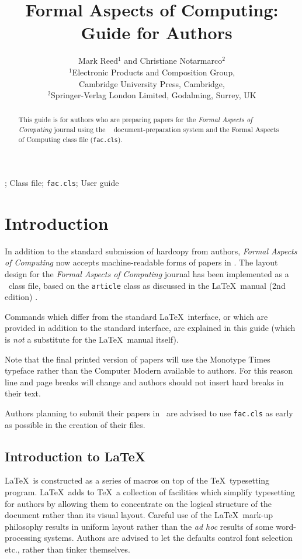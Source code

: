 \documentclass{fac}
\title[Formal Aspects of Computing: \LaTeXe\ Submissions]
      {Formal Aspects of Computing:\\
       \LaTeXe\ Guide for Authors}
\author[M. Reed and C. Notarmarco]
    {Mark Reed$^1$ and Christiane Notarmarco$^2$\\
     $^1$Electronic Products and Composition Group,\\
     Cambridge University Press, Cambridge,\\
     $^2$Springer-Verlag London Limited, Godalming, Surrey, UK}
\begin{document}
\label{firstpage}

\makecorrespond

\maketitle

\begin{abstract}
This guide is for authors who are preparing papers for the
\emph{Formal Aspects of Computing} journal using the \LaTeXe\ %
document-preparation system and the Formal Aspects of Computing
class file (\texttt{fac.cls}).
\end{abstract}

\begin{keywords}
\LaTeXe; Class file; \verb"fac.cls"; User guide
\end{keywords}

\section{Introduction}

In addition to the standard submission of hardcopy from authors,
\emph{Formal Aspects of Computing} now accepts machine-readable forms of papers
in \LaTeXe. The layout design for the \emph{Formal Aspects of Computing} journal
has been implemented as a \LaTeXe\ class file, based on the \verb"article"
class as discussed in the \LaTeX\ manual (2nd edition) \cite{Lam:LaTeX}.

Commands which differ from the standard \LaTeX\ interface, or which are
provided in addition to the standard interface, are explained in this
guide (which is \emph{not} a substitute for the \LaTeX\ manual itself).

Note that the final printed version of papers will use the Monotype Times
typeface rather than the Computer Modern available to authors. For this reason
line and page breaks will change and authors should not insert hard breaks
in their text.

Authors planning to submit their papers in \LaTeXe\ are advised to use
\verb"fac.cls" as early as possible in the creation of their files.

\subsection{Introduction to \LaTeX}

\LaTeX\ is constructed as a series of macros on top of the \TeX\ typesetting
program. \LaTeX\ adds to \TeX\ a collection of facilities which simplify
typesetting for authors by allowing them to concentrate on the logical
structure of the document rather than its visual layout. Careful use of the
\LaTeX\ mark-up philosophy results in uniform layout rather than the
\emph{ad hoc} results of some word-processing systems. Authors are advised to
let the defaults control font selection etc., rather than tinker themselves.
\end{document}
